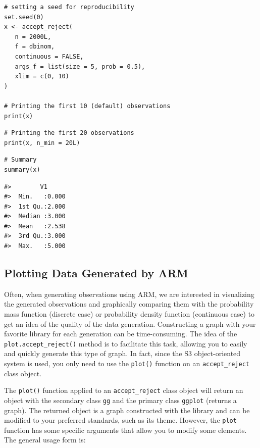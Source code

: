 \begin{verbatim}
# setting a seed for reproducibility
set.seed(0)
x <- accept_reject(
   n = 2000L,
   f = dbinom,
   continuous = FALSE,
   args_f = list(size = 5, prob = 0.5),
   xlim = c(0, 10)
)

# Printing the first 10 (default) observations
print(x)
\end{verbatim}

\begin{verbatim}
# Printing the first 20 observations
print(x, n_min = 20L)
\end{verbatim}

\begin{verbatim}
# Summary
summary(x)
\end{verbatim}

\begin{verbatim}
#>        V1       
#>  Min.   :0.000  
#>  1st Qu.:2.000  
#>  Median :3.000  
#>  Mean   :2.538  
#>  3rd Qu.:3.000  
#>  Max.   :5.000
\end{verbatim}

\subsection{Plotting Data Generated by ARM}\label{plotting-data-generated-by-arm}

Often, when generating observations using ARM, we are interested in visualizing the generated observations and graphically comparing them with the probability mass function (discrete case) or probability density function (continuous case) to get an idea of the quality of the data generation. Constructing a graph with your favorite library for each generation can be time-consuming. The idea of the \texttt{plot.accept\_reject()} method is to facilitate this task, allowing you to easily and quickly generate this type of graph. In fact, since the S3 object-oriented system is used, you only need to use the \texttt{plot()} function on an \texttt{accept\_reject} class object.

The \texttt{plot()} function applied to an \texttt{accept\_reject} class object will return an object with the secondary class \texttt{gg} and the primary class \texttt{ggplot} (returns a graph). The returned object is a graph constructed with the  library and can be modified to your preferred  standards, such as its theme. However, the \texttt{plot} function has some specific arguments that allow you to modify some elements. The general usage form is:

